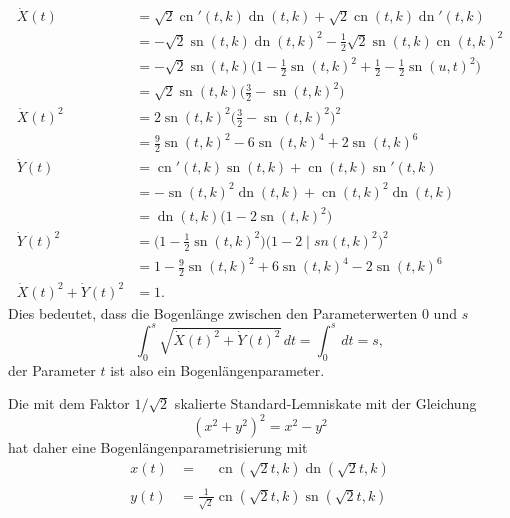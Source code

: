 \begin{align*}
\dot{X}(t)
&=
\sqrt{2}\operatorname{cn}'(t,k)\operatorname{dn}(t,k)
+
\sqrt{2}\operatorname{cn}(t,k)\operatorname{dn}'(t,k)
\\
&=
-\sqrt{2}\operatorname{sn}(t,k)\operatorname{dn}(t,k)^2
-\frac12\sqrt{2}\operatorname{sn}(t,k)\operatorname{cn}(t,k)^2
\\
&=
-\sqrt{2}\operatorname{sn}(t,k)\bigl(
1-{\textstyle\frac12}\operatorname{sn}(t,k)^2
+{\textstyle\frac12}-{\textstyle\frac12}\operatorname{sn}(u,t)^2
\bigr)
\\
&=
\sqrt{2}\operatorname{sn}(t,k)
\bigl(
{\textstyle \frac32}-\operatorname{sn}(t,k)^2
\bigr)
\\
\dot{X}(t)^2
&=
2\operatorname{sn}(t,k)^2
\bigl(
{\textstyle \frac32}-\operatorname{sn}(t,k)^2
\bigr)^2
\\
&=
{\textstyle\frac{9}{2}}\operatorname{sn}(t,k)^2
-
6\operatorname{sn}(t,k)^4
+2\operatorname{sn}(t,k)^6
\\
\dot{Y}(t)
&=
\operatorname{cn}'(t,k)\operatorname{sn}(t,k)
+
\operatorname{cn}(t,k)\operatorname{sn}'(t,k)
\\
&=
-\operatorname{sn}(t,k)^2
\operatorname{dn}(t,k)
+\operatorname{cn}(t,k)^2
\operatorname{dn}(t,k)
\\
&=
\operatorname{dn}(t,k)\bigl(1-2\operatorname{sn}(t,k)^2\bigr)
\\
\dot{Y}(t)^2
&=
\bigl(1-{\textstyle\frac12}\operatorname{sn}(t,k)^2\bigr)
\bigl(1-2\operatorname|{sn}(t,k)^2\bigr)^2
\\
&=
1-{\textstyle\frac{9}{2}}\operatorname{sn}(t,k)^2
+6\operatorname{sn}(t,k)^4
-2\operatorname{sn}(t,k)^6
\\
\dot{X}(t)^2 + \dot{Y}(t)^2
&=
1.
\end{align*}
Dies bedeutet, dass die Bogenlänge zwischen den Parameterwerten $0$ und $s$
\[
\int_0^s
\sqrt{\dot{X}(t)^2 + \dot{Y}(t)^2}
\,dt
=
\int_0^s\,dt
=
s,
\]
der Parameter $t$ ist also ein Bogenlängenparameter.

Die mit dem Faktor $1/\sqrt{2}$ skalierte Standard-Lemniskate mit der
Gleichung
\[
(x^2+y^2)^2 = x^2-y^2
\]
hat daher eine Bogenlängenparametrisierung mit
\begin{equation}
\begin{aligned}
x(t)
&=
\phantom{\frac{1}{\sqrt{2}}}
\operatorname{cn}(\sqrt{2}t,k)\operatorname{dn}(\sqrt{2}t,k)
\\
y(t)
&=
\frac{1}{\sqrt{2}}\operatorname{cn}(\sqrt{2}t,k)\operatorname{sn}(\sqrt{2}t,k)
\end{aligned}
\label{buch:elliptisch:lemniskate:bogenlaenge}
\end{equation}

